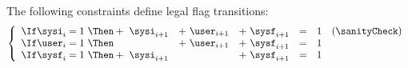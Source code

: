 The following constraints define legal flag transitions:
\[
	\left\{ \begin{array}{lrrrrrrrrr}
		\If \sysi _{i} = 1 ~ \Then + ~ \sysi _{i + 1} & + ~ \user _{i + 1} & + ~ \sysf _{i + 1} & = & 1 & (\sanityCheck) \\
		\If \user _{i} = 1 ~ \Then   ~                & + ~ \user _{i + 1} & + ~ \sysf _{i + 1} & = & 1                  \\
		\If \sysf _{i} = 1 ~ \Then + ~ \sysi _{i + 1} &   ~                & + ~ \sysf _{i + 1} & = & 1                  \\
	\end{array} \right.
\]
